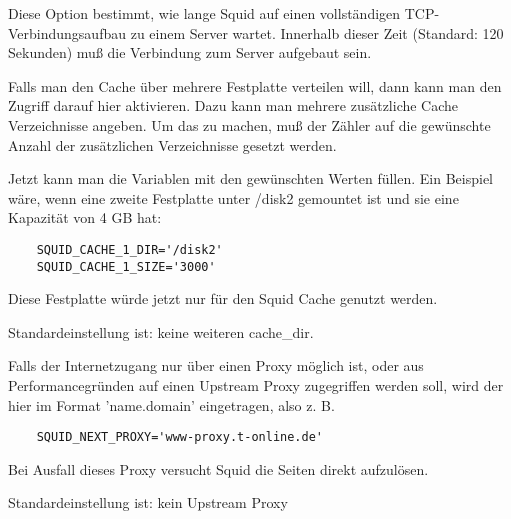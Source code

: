 \begin{description}

                Diese Option bestimmt, wie lange Squid auf einen vollständigen
                TCP-Verbindungsaufbau zu einem Server wartet. Innerhalb dieser
                Zeit (Standard: 120 Sekunden) muß die Verbindung zum Server
                aufgebaut sein.



                Falls man den Cache über mehrere Festplatte verteilen will,
                dann kann man den Zugriff darauf hier aktivieren. Dazu kann
                man mehrere zusätzliche Cache Verzeichnisse angeben. Um das zu
                machen, muß der Zähler auf die gewünschte Anzahl der
                zusätzlichen Verzeichnisse gesetzt werden.

                Jetzt kann man die Variablen
                mit den gewünschten Werten füllen. Ein Beispiel wäre, wenn
                eine zweite Festplatte unter /disk2 gemountet ist und sie eine
                Kapazität von 4 GB hat:
\begin{verbatim}
	SQUID_CACHE_1_DIR='/disk2'
	SQUID_CACHE_1_SIZE='3000'
\end{verbatim}
                Diese Festplatte würde jetzt nur für den Squid Cache genutzt
                werden.

                Standardeinstellung ist: keine weiteren cache\_dir.



                Falls der Internetzugang nur über einen Proxy möglich ist,
                oder aus Performancegründen auf einen Upstream Proxy
                zugegriffen werden soll, wird der hier im Format
                'name.domain' eingetragen, also z. B.
\begin{verbatim}
	SQUID_NEXT_PROXY='www-proxy.t-online.de'
\end{verbatim}
                Bei Ausfall dieses Proxy versucht Squid die Seiten direkt
                aufzulösen.

                Standardeinstellung ist: kein Upstream Proxy




\end{description}
